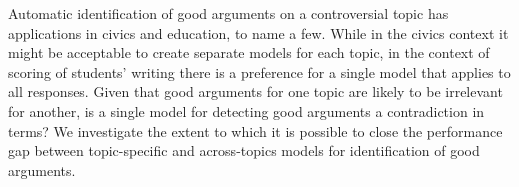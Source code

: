Automatic identification of good arguments on a controversial topic has applications in civics and education, to name a few. While in the civics context it might be acceptable to create separate models for  each topic, in the context of              scoring of students' writing there is a preference for a single model that applies to all responses. Given that good arguments for one topic are likely to be irrelevant for another, is a single model for detecting good arguments a contradiction in terms? We investigate the extent to which it is possible to close the performance gap between topic-specific and across-topics models for identification of good arguments.
